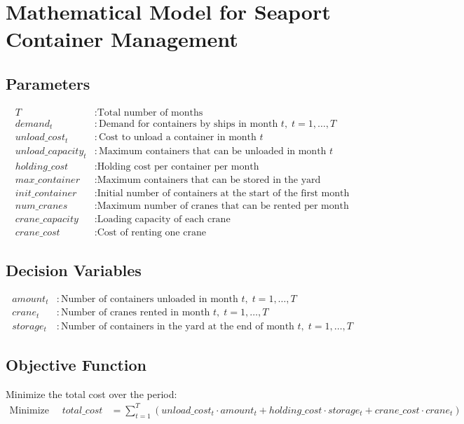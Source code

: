 \documentclass{article}
\begin{document}
\section*{Mathematical Model for Seaport Container Management}

\subsection*{Parameters}
\begin{align*}
T & : \text{Total number of months} \\
demand_t & : \text{Demand for containers by ships in month } t, \; t = 1, \ldots, T \\
unload\_cost_t & : \text{Cost to unload a container in month } t \\
unload\_capacity_t & : \text{Maximum containers that can be unloaded in month } t \\
holding\_cost & : \text{Holding cost per container per month} \\
max\_container & : \text{Maximum containers that can be stored in the yard} \\
init\_container & : \text{Initial number of containers at the start of the first month} \\
num\_cranes & : \text{Maximum number of cranes that can be rented per month} \\
crane\_capacity & : \text{Loading capacity of each crane} \\
crane\_cost & : \text{Cost of renting one crane}
\end{align*}

\subsection*{Decision Variables}
\begin{align*}
amount_t & : \text{Number of containers unloaded in month } t, \; t = 1, \ldots, T \\
crane_t & : \text{Number of cranes rented in month } t, \; t = 1, \ldots, T \\
storage_t & : \text{Number of containers in the yard at the end of month } t, \; t = 1, \ldots, T
\end{align*}

\subsection*{Objective Function}
Minimize the total cost over the period:
\begin{align*}
\text{Minimize } \quad total\_cost & = \sum_{t=1}^{T} \left( unload\_cost_t \cdot amount_t + holding\_cost \cdot storage_t + crane\_cost \cdot crane_t \right)
\end{align*}
\end{document}
